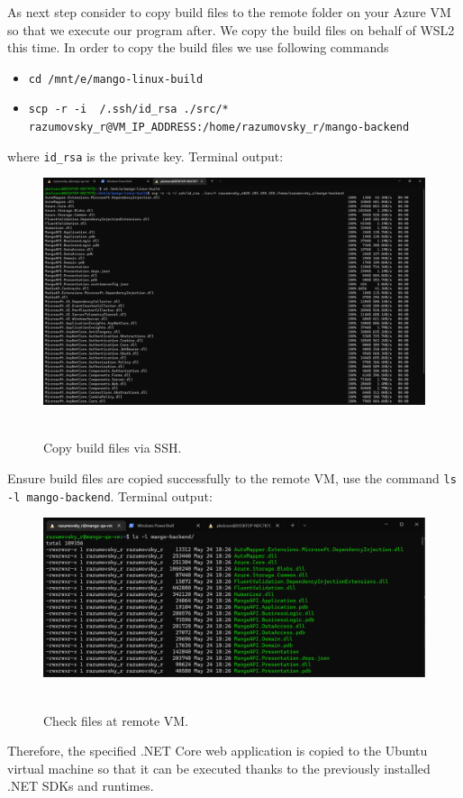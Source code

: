 As next step consider to copy build files to the remote folder on your Azure VM so that we execute our program after.
We copy the build files on behalf of WSL2 this time.
In order to copy the build files we use following commands
\begin{itemize}
    \item \texttt{cd /mnt/e/mango-linux-build}
    \item \texttt{scp -r -i ~/.ssh/id\_rsa ./src/* \\ razumovsky\_r@VM\_IP\_ADDRESS:/home/razumovsky\_r/mango-backend}
\end{itemize}
where \texttt{id\_rsa} is the private key.
Terminal output:
\begin{figure}[H]
    \centering
    \includegraphics[width=1\textwidth]{img/04_copy_build_files_via_ssh}
    ~\caption{Copy build files via SSH.}\label{fig:figure11}
\end{figure}
Ensure build files are copied successfully to the remote VM, use the command \texttt{ls -l mango-backend}.
Terminal output:
\begin{figure}[H]
    \centering
    \includegraphics[width=1\textwidth]{img/04_verify_files_on_remote_vm}
    ~\caption{Check files at remote VM.}\label{fig:figure12}
\end{figure}
Therefore, the specified .NET Core web application is copied to the Ubuntu virtual machine so that it can be executed
thanks to the previously installed .NET SDKs and runtimes.
